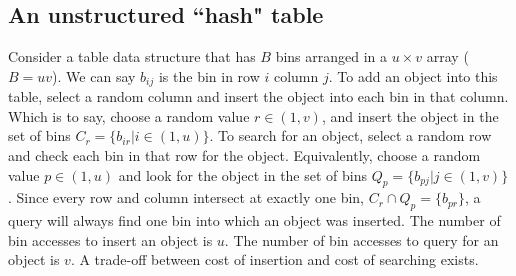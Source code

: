 \documentclass[conference]{IEEEtran}
\begin{document}
\subsection{An unstructured ``hash" table}
\label{sec:localtab}
Consider a table data structure that has $B$ bins arranged in a $u\times v$
array ($B=uv$).  We can say $b_{ij}$ is the bin in row $i$ column $j$.  To add an
object into this table, select a random column and insert the object into each
bin in that column.  Which is to say, choose a random value $r\in (1,v)$,
and insert the object in the set of bins $C_r = \{b_{ir} | i \in (1,u)\}$.
To search for an object, select a random row and check each bin in that
row for the
object.  Equivalently, choose a random value $p \in (1,u)$ and look
for the object in the set of bins $Q_p = \{b_{pj} | j \in (1,v)\}$.  Since
every row and column intersect at exactly one bin, $C_r \cap Q_p = \{b_{pr}\}$,
a query will always find
one bin into which an object was inserted.  The number of bin accesses to
insert an object is $u$.  The number of bin accesses to query for an object is
$v$.  A trade-off between cost of insertion and cost of searching exists.
\end{document}

